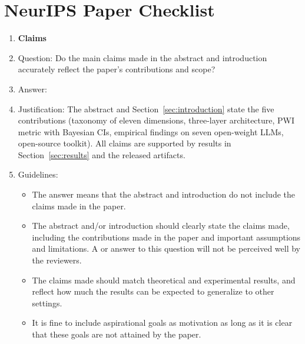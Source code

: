 \section*{NeurIPS Paper Checklist}

\begin{enumerate}

\item {\bf Claims}
    \item[] Question: Do the main claims made in the abstract and introduction accurately reflect the paper's contributions and scope?
    \item[] Answer: \answerYes{}
    \item[] Justification: The abstract and Section~\ref{sec:introduction} state the five contributions (taxonomy of eleven dimensions, three-layer architecture, PWI metric with Bayesian CIs, empirical findings on seven open-weight LLMs, open-source toolkit). All claims are supported by results in Section~\ref{sec:results} and the released artifacts.
    \item[] Guidelines:
    \begin{itemize}
        \item The answer \answerNA{} means that the abstract and introduction do not include the claims made in the paper.
        \item The abstract and/or introduction should clearly state the claims made, including the contributions made in the paper and important assumptions and limitations. A \answerNo{} or \answerNA{} answer to this question will not be perceived well by the reviewers.
        \item The claims made should match theoretical and experimental results, and reflect how much the results can be expected to generalize to other settings.
        \item It is fine to include aspirational goals as motivation as long as it is clear that these goals are not attained by the paper.
    \end{itemize}


\end{enumerate}
